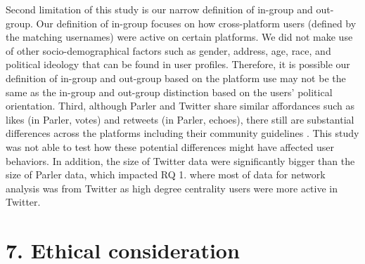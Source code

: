 \documentclass[Crown,sagev,times]{sagej}
\begin{document}
Second limitation of this study is our narrow definition of in-group and out-group. 
Our definition of in-group focuses on how cross-platform users (defined by the matching usernames) 
were active on certain platforms. We did not make use of other socio-demographical factors such as gender, 
address, age, race, and political ideology that can be found in user profiles. Therefore, it is possible 
our definition of in-group and out-group based on the platform use may not be the same as the in-group and out-group 
distinction based on the users' political orientation.
Third, although Parler and Twitter share similar affordances \cite{bucher2018affordances} such as likes (in Parler, votes) 
and retweets (in Parler, echoes), there still are substantial differences across the platforms including 
their community guidelines \cite{m2021political}. This study was not able to test how these potential differences 
might have affected user behaviors. In addition, the size of Twitter data were significantly bigger than the size 
of Parler data, which impacted RQ 1. where most of data for network analysis was from Twitter as high degree centrality users
were more active in Twitter.

\section{7. Ethical consideration}
\end{document}
